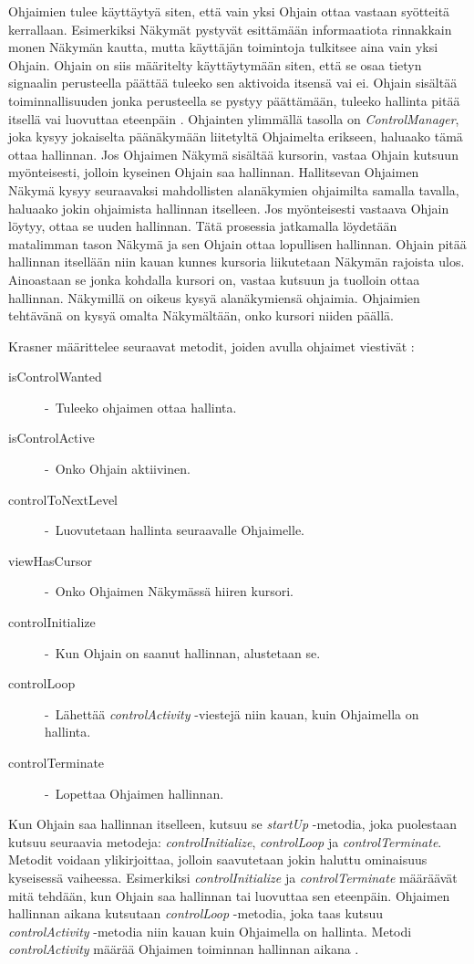 \documentclass[utf8]{gradu3}
\begin{document}
Ohjaimien tulee käyttäytyä siten, että vain yksi Ohjain ottaa vastaan syötteitä kerrallaan. Esimerkiksi Näkymät pystyvät esittämään informaatiota rinnakkain monen Näkymän kautta, mutta käyttäjän toimintoja tulkitsee aina vain yksi Ohjain. Ohjain on siis määritelty käyttäytymään siten, että se osaa tietyn signaalin perusteella päättää tuleeko sen aktivoida itsensä vai ei. Ohjain sisältää toiminnallisuuden jonka perusteella se pystyy päättämään, tuleeko hallinta pitää itsellä vai luovuttaa eteenpäin \parencite[s. 9]{krasner_desc}. Ohjainten ylimmällä tasolla on \textit{ControlManager}, joka kysyy jokaiselta päänäkymään liitetyltä Ohjaimelta erikseen, haluaako tämä ottaa hallinnan. Jos Ohjaimen Näkymä sisältää kursorin, vastaa Ohjain kutsuun myönteisesti, jolloin kyseinen Ohjain saa hallinnan. Hallitsevan Ohjaimen Näkymä kysyy seuraavaksi mahdollisten alanäkymien ohjaimilta samalla tavalla, haluaako jokin ohjaimista hallinnan itselleen. Jos myönteisesti vastaava Ohjain löytyy, ottaa se uuden hallinnan. Tätä prosessia jatkamalla löydetään matalimman tason Näkymä ja sen Ohjain ottaa lopullisen hallinnan. Ohjain pitää hallinnan itsellään niin kauan kunnes kursoria liikutetaan Näkymän rajoista ulos. Ainoastaan se jonka kohdalla kursori on, vastaa kutsuun ja tuolloin ottaa hallinnan. Näkymillä on oikeus kysyä alanäkymiensä ohjaimia. Ohjaimien tehtävänä on kysyä omalta Näkymältään, onko kursori niiden päällä.

Krasner määrittelee seuraavat metodit, joiden avulla ohjaimet viestivät \parencite[s. 9]{krasner_desc}:

\begin{description}
\item[isControlWanted] -\ Tuleeko ohjaimen ottaa hallinta.
\item[isControlActive] -\ Onko Ohjain aktiivinen.
\item[controlToNextLevel] -\ Luovutetaan hallinta seuraavalle Ohjaimelle.
\item[viewHasCursor] -\ Onko Ohjaimen Näkymässä hiiren kursori.
\item[controlInitialize] -\ Kun Ohjain on saanut hallinnan, alustetaan se.
\item[controlLoop] -\ Lähettää \emph{controlActivity} -viestejä niin kauan, kuin Ohjaimella on hallinta.
\item[controlTerminate] -\ Lopettaa Ohjaimen hallinnan.
\end{description} 


Kun Ohjain saa hallinnan itselleen, kutsuu se \emph{startUp} -metodia, joka puolestaan kutsuu seuraavia metodeja: \emph{controlInitialize}, \emph{controlLoop} ja \emph{controlTerminate}. Metodit
voidaan ylikirjoittaa, jolloin saavutetaan jokin haluttu ominaisuus kyseisessä vaiheessa. Esimerkiksi \emph{controlInitialize} ja \emph{controlTerminate} määräävät mitä tehdään, kun Ohjain saa hallinnan tai luovuttaa sen eteenpäin. Ohjaimen hallinnan aikana kutsutaan
\emph{controlLoop} -metodia, joka taas kutsuu \emph{controlActivity} -metodia niin kauan kuin Ohjaimella on hallinta. Metodi \emph{controlActivity} määrää Ohjaimen toiminnan hallinnan aikana \parencite[s. 9]{krasner_desc}.
\end{document}
